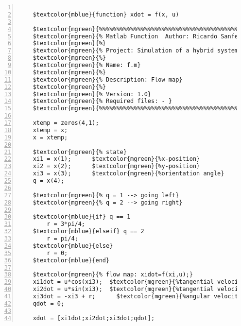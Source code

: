 %  
%  
%  
%  
  
  
\DefineShortVerb[fontfamily=courier,fontseries=m]{\$} 
\DefineShortVerb[fontfamily=courier,fontseries=b]{\#} 
  
\begin{Verbatim}[commandchars=\$\{\},numbers=left,numbersep=2pt] 

    $textcolor{mblue}{function} xdot = f(x, u) 
     
    $textcolor{mgreen}{%%%%%%%%%%%%%%%%%%%%%%%%%%%%%%%%%%%%%%%%%%%%%%%%%%%%%%%%%%%%%%%%%%%%%%%%%%%} 
    $textcolor{mgreen}{% Matlab Function  Author: Ricardo Sanfelice} 
    $textcolor{mgreen}{%} 
    $textcolor{mgreen}{% Project: Simulation of a hybrid system (Vehicle Traveling on a Track)} 
    $textcolor{mgreen}{%} 
    $textcolor{mgreen}{% Name: f.m} 
    $textcolor{mgreen}{%} 
    $textcolor{mgreen}{% Description: Flow map} 
    $textcolor{mgreen}{%} 
    $textcolor{mgreen}{% Version: 1.0} 
    $textcolor{mgreen}{% Required files: - } 
    $textcolor{mgreen}{%%%%%%%%%%%%%%%%%%%%%%%%%%%%%%%%%%%%%%%%%%%%%%%%%%%%%%%%%%%%%%%%%%%%%%%%%%%} 
     
    xtemp = zeros(4,1); 
    xtemp = x; 
    x = xtemp; 
     
    $textcolor{mgreen}{% state} 
    xi1 = x(1);      $textcolor{mgreen}{%x-position} 
    xi2 = x(2);      $textcolor{mgreen}{%y-position} 
    xi3 = x(3);      $textcolor{mgreen}{%orientation angle} 
    q = x(4);        
     
    $textcolor{mgreen}{% q = 1 --> going left} 
    $textcolor{mgreen}{% q = 2 --> going right} 
     
    $textcolor{mblue}{if} q == 1 
        r = 3*pi/4; 
    $textcolor{mblue}{elseif} q == 2 
        r = pi/4; 
    $textcolor{mblue}{else} 
        r = 0; 
    $textcolor{mblue}{end} 
     
    $textcolor{mgreen}{% flow map: xidot=f(xi,u);} 
    xi1dot = u*cos(xi3);  $textcolor{mgreen}{%tangential velocity in x-direction} 
    xi2dot = u*sin(xi3);  $textcolor{mgreen}{%tangential velocity in y-direction} 
    xi3dot = -xi3 + r;      $textcolor{mgreen}{%angular velocity} 
    qdot = 0; 
     
    xdot = [xi1dot;xi2dot;xi3dot;qdot];  
\end{Verbatim}  
  
\UndefineShortVerb{\$} 
\UndefineShortVerb{\#} 
 